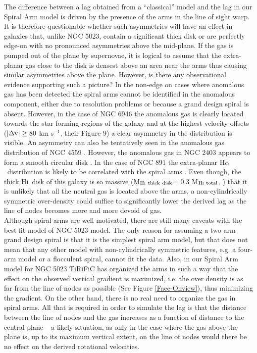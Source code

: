 \documentclass[useAMS,usenatbib]{mn2e}
\newcommand\HI{H{\sc i}}
\newcommand\Halpha{H$\alpha$ }
\begin{document}
{ \indent  The difference between a lag obtained from a ``classical'' model and the lag in our Spiral Arm model is driven by the presence of the arms in the line of sight warp. It is therefore questionable whether  such asymmetries will have an effect in galaxies that, unlike NGC 5023, contain a significant thick disk or are perfectly edge-on with no pronounced asymmetries above the mid-plane. If the gas is pumped out of the plane by supernovae, it is logical to assume that the extra-planar gas close to the disk is densest above an area near the arms thus causing similar asymmetries above the plane. However, is there any observational evidence supporting such a picture? In the non-edge on cases where anomalous gas has been detected the spiral arms cannot be identified in the anomalous component, either due to resolution problems or because a grand design spiral is absent. However, in the case of NGC 6946 the anomalous gas is clearly located towards the star forming regions of the galaxy \citep{2008A&A...490..555B} and at the highest velocity offsets ($|\Delta {\rm v}|\geq 80$ km s$^{-1}$, their Figure 9) a clear asymmetry in the distribution is visible. An asymmetry can also be tentatively seen in the anomalous gas distribution of NGC 4559 \citep[Figure 6]{2005A&A...439..947B}. However, the anomalous gas in NGC 2403 appears to form a smooth circular disk \citep{2002AJ....123.3124F}. In the case of NGC 891 the extra-planar \Halpha\ distribution is likely to be correlated with the spiral arms \citep{Kamphuis2007b}. Even though, the thick \HI\ disk of this galaxy is so massive (M$_{\rm H\textsc{i}\ thick\ disk}$= 0.3 M$_{\rm H\textsc{i}\ total}$, \cite{Oosterloo2007})   that   it is unlikely that all the neutral gas is located above the arms, a non-cylindrically symmetric over-density could suffice to significantly lower the derived lag as the line of nodes becomes more and more devoid of gas. \\
 \indent Although spiral arms are well motivated, there are still many caveats with the best fit model of NGC 5023 model. The only reason for  assuming a two-arm grand design spiral is that it is the simplest spiral arm model, but that does not mean that any other model with non-cylindrically symmetric features,  e.g. a four-arm model or a flocculent spiral, cannot fit the data. Also, in our Spiral Arm model for NGC 5023 {\sc TiRiFiC} has organized the arms in such a way that the effect on the observed vertical gradient is maximized, i.e. the over density is as far from the line of nodes as possible (See Figure \ref{Face-Onview}), thus minimizing the gradient. On the other hand, there is no real need to organize the gas in spiral arms. All that is required in order to simulate the lag is that the distance between the line of nodes and the gas increases as a function of distance to the central plane -- a likely situation, as only in the case  where the gas above the plane is, up to its maximum vertical extent, on the line of nodes would there be no effect on the derived rotational velocities.\\
}
\end{document}
